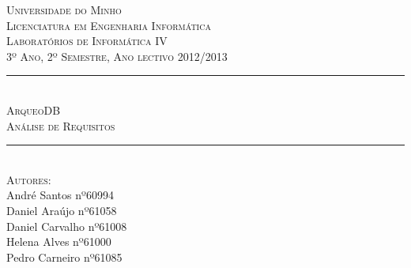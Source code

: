 \documentclass[12pt,a4paper]{article}
\begin{document}
\begin{titlepage}
\onehalfspacing

\newcommand{\HRule}{\rule{\linewidth}{0.5mm}} %

\center %
 

\textsc{\LARGE Universidade do Minho}\\[1.5cm] %
\textsc{\Large Licenciatura em Engenharia Informática}\\[0.5cm] %
\textsc{\large Laboratórios de Informática IV}\\[0.5cm] %
\textsc{3º Ano, 2º Semestre, Ano lectivo 2012/2013}\\[0.5cm]


\HRule \\[0.4cm]
\textsc{\Large ArqueoDB}\\[0.4cm] %
\textsc{ \large Análise de Requisitos}\\[0.4cm] %
\HRule \\[1.5cm]
 

\textsc{\large Autores:}\\
{André Santos nº60994 \\ Daniel Araújo nº61058 \\ Daniel Carvalho nº61008\\ Helena Alves nº61000 \\ Pedro Carneiro nº61085}\\[1cm] %



\end{titlepage}
\end{document}
